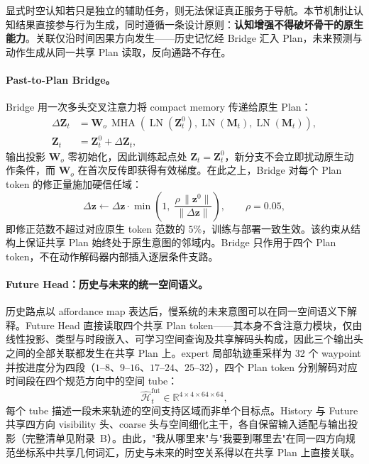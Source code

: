 \documentclass[10pt]{ctexart}
\begin{document}
显式时空认知若只是独立的辅助任务，则无法保证真正服务于导航。本节机制让认知结果直接参与行为生成，同时遵循一条设计原则：\textbf{认知增强不得破坏骨干的原生能力}。关联仅沿时间因果方向发生——历史记忆经 Bridge 汇入 Plan，未来预测与动作生成从同一共享 Plan 读取，反向通路不存在。

\paragraph{Past-to-Plan Bridge。}
Bridge 用一次多头交叉注意力将 compact memory 传递给原生 Plan：
\begin{equation}
\begin{aligned}
\Delta\mathbf{Z}_t
&=
\mathbf{W}_{o}\,
\operatorname{MHA}
\left(
\operatorname{LN}(\mathbf{Z}^{0}_t),
\operatorname{LN}(\mathbf{M}_t),
\operatorname{LN}(\mathbf{M}_t)
\right),\\
\mathbf{Z}_t
&=
\mathbf{Z}^{0}_t+\Delta\mathbf{Z}_t,
\end{aligned}
\label{eq:bridge}
\end{equation}
输出投影 $\mathbf{W}_{o}$ 零初始化，因此训练起点处 $\mathbf{Z}_t=\mathbf{Z}^{0}_t$，新分支不会立即扰动原生动作条件，而 $\mathbf{W}_{o}$ 在首次反传即获得有效梯度。在此之上，Bridge 对每个 Plan token 的修正量施加硬信任域：
\begin{equation}
\Delta\mathbf{z}
\leftarrow
\Delta\mathbf{z}\cdot
\min\!\left(
1,\;
\frac{\rho\,\|\mathbf{z}^{0}\|}{\|\Delta\mathbf{z}\|}
\right),
\qquad
\rho=0.05,
\label{eq:trust_region}
\end{equation}
即修正范数不超过对应原生 token 范数的 $5\%$，训练与部署一致生效。该约束从结构上保证共享 Plan 始终处于原生意图的邻域内。Bridge 只作用于四个 Plan token，不在动作解码器内部插入逐层条件支路。

\paragraph{Future Head：历史与未来的统一空间语义。}
历史路点以 affordance map 表达后，慢系统的未来意图可以在同一空间语义下解释。Future Head 直接读取四个共享 Plan token——其本身不含注意力模块，仅由线性投影、类型与时段嵌入、可学习空间查询及共享解码头构成，因此三个输出头之间的全部关联都发生在共享 Plan 上。expert 局部轨迹重采样为 32 个 waypoint 并按进度分为四段（$1$--$8$、$9$--$16$、$17$--$24$、$25$--$32$），四个 Plan token 分别解码对应时间段在四个规范方向中的空间 tube：
\[
\widehat{\mathcal{H}}^{\mathrm{fut}}_t
\in
\mathbb{R}^{4\times4\times64\times64},
\]
每个 tube 描述一段未来轨迹的空间支持区域而非单个目标点。History 与 Future 共享四方向 visibility 头、coarse 头与空间细化主干，各自保留输入适配与输出投影（完整清单见附录~B）。由此，"我从哪里来"与"我要到哪里去"在同一四方向规范坐标系中共享几何词汇，历史与未来的时空关系得以在共享 Plan 上直接关联。
\end{document}

